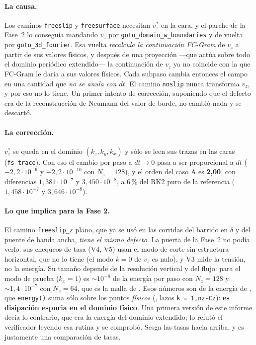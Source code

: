 \paragraph{La causa.} Los caminos \texttt{freeslip} y \texttt{freesurface} necesitan
$v^*_z$ en la cara, y el parche de la Fase~2 lo conseguía mandando $v_z$ por
\texttt{goto\_domain\_w\_boundaries} y de vuelta por \texttt{goto\_3d\_fourier}. Esa vuelta
\emph{recalcula la continuación FC-Gram} de $v_z$ a partir de sus valores físicos, y después
de una proyección ---que actúa sobre todo el dominio periódico extendido--- la
continuación de $v_z$ ya no coincide con la que FC-Gram le daría a sus valores físicos. Cada
subpaso cambia entonces el campo en una cantidad que \emph{no se anula con $dt$}. El camino
\texttt{noslip} nunca transforma $v_z$, y por eso no lo tiene. Un primer intento de
corrección, suponiendo que el defecto era de la reconstrucción de Neumann del valor de
borde, no cambió nada y se descartó.

\paragraph{La corrección.} $v^*_z$ se queda en el dominio $(k_z,k_y,k_x)$ y sólo se leen sus
trazas en las caras (\texttt{fs\_trace}). Con eso el cambio por paso a $dt\to0$ pasa a ser
proporcional a $dt$ ($-2{,}2\cdot10^{-9}$ y $-2{,}2\cdot10^{-10}$ con $N_z=128$), y el orden
del caso A es \textbf{2{,}00}, con diferencias $1{,}381\cdot10^{-7}$ y
$3{,}450\cdot10^{-8}$, a 6\,\% del RK2 puro de la referencia ($1{,}458\cdot10^{-7}$ y
$3{,}646\cdot10^{-8}$).

\paragraph{Lo que implica para la Fase 2\propio.} El camino \texttt{freeslip\_z} plano, que
ya se usó en las corridas del barrido en $\delta$ y del puente de banda ancha, \emph{tiene
el mismo defecto}. La puerta de la Fase~2 no podía verlo: sus chequeos de tasa (V4, V5)
usan el modo de corte sin estructura horizontal, que no lo tiene (el modo $k=0$ de $v_z$ es
nulo), y V3 mide la tensión, no la energía. Su tamaño depende de la resolución vertical y del
flujo: para el modo de prueba ($k_x=1$) es $\sim10^{-8}$ de la energía por paso con
$N_z=128$ y $\sim1{,}4\cdot10^{-7}$ con $N_z=64$, que es la malla de
. Esos números son de la energía de
, que \texttt{energy()} suma sólo sobre los puntos \emph{físicos}
(, lazos \texttt{k = 1,nz-Cz}): \textbf{es disipación espuria en
el dominio físico}. Una primera versión de este informe decía lo contrario, que era la energía
del dominio extendido; lo refutó el verificador leyendo esa rutina y se comprobó. Sesga las
tasas hacia arriba, y  es justamente una comparación de tasas.

